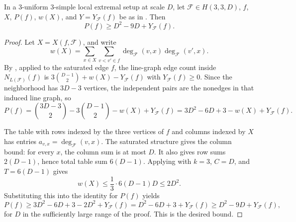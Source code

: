 \begin{lemma}
In a $3$-uniform $3$-simple local extremal setup at scale $D$, let
$\mathcal F\in H(3,3,D)$, $f$, $X$, $P(f)$, $w(X)$, and
$Y=Y_{\mathcal F}(f)$ be as in
.  Then
\[
P(f)\ge D^2-9D+Y_{\mathcal F}(f).
\]
\end{lemma}
\begin{proof}
Let $X=X(f,\mathcal F)$, and write
\[
w(X)=\sum_{x\in X}\sum_{v<v'\in f}
\deg_{\mathcal F}(v,x)\deg_{\mathcal F}(v',x).
\]
By , applied to the saturated edge
$f$, the line-graph edge count inside $N_{L(\mathcal F)}(f)$ is
$3\binom{D-1}{2}+w(X)-Y_{\mathcal F}(f)$ with
$Y_{\mathcal F}(f)\ge0$.  Since the neighborhood has $3D-3$ vertices, the
independent pairs are the nonedges in that induced line graph, so
\[
P(f)=\binom{3D-3}{2}-3\binom{D-1}{2}-w(X)+Y_{\mathcal F}(f)
=3D^2-6D+3-w(X)+Y_{\mathcal F}(f).
\]

The table with rows indexed by the three vertices of $f$ and columns indexed
by $X$ has entries $a_{v,x}=\deg_{\mathcal F}(v,x)$.  The saturated structure
 gives the column bound: for every
$x$, the column sum is at most $D$.  It also gives row sums $2(D-1)$, hence
total table sum $6(D-1)$.
Applying  with $k=3$, $C=D$, and
$T=6(D-1)$ gives
\[
w(X)\le \frac13\cdot 6(D-1)D\le 2D^2 .
\]
Substituting this into the identity for $P(f)$ yields
\[
P(f)\ge 3D^2-6D+3-2D^2+Y_{\mathcal F}(f)
=D^2-6D+3+Y_{\mathcal F}(f)
\ge D^2-9D+Y_{\mathcal F}(f),
\]
for $D$ in the sufficiently large range of the proof.  This is the desired
bound.
\end{proof}
